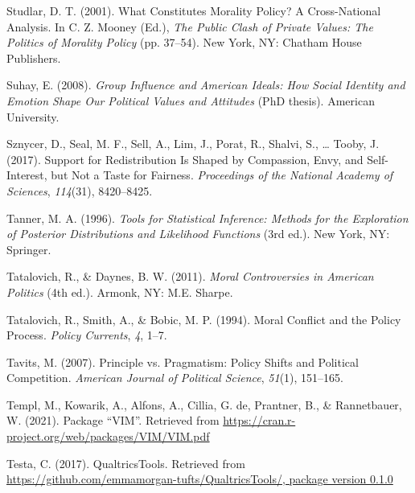 \documentclass[12pt,econ]{sources/authesis}
\newenvironment{CSLReferences}%
  {}%
  {\par}
\begin{document}
\begin{CSLReferences}{1}{0}
\leavevmode{}%
Studlar, D. T. (2001). {What Constitutes Morality Policy? A Cross-National Analysis}. In C. Z. Mooney (Ed.), \emph{The {Public} {Clash} of {Private} {Values}: {The} {Politics} of {Morality} {Policy}} (pp. 37--54). New York, NY: Chatham House Publishers.

\leavevmode{}%
Suhay, E. (2008). \emph{{Group Influence and American Ideals: How Social Identity and Emotion Shape Our Political Values and Attitudes}} (PhD thesis). American University.

\leavevmode{}%
Sznycer, D., Seal, M. F., Sell, A., Lim, J., Porat, R., Shalvi, S., \ldots{} Tooby, J. (2017). {Support for Redistribution Is Shaped by Compassion, Envy, and Self-Interest, but Not a Taste for Fairness}. \emph{Proceedings of the National Academy of Sciences}, \emph{114}(31), 8420--8425.

\leavevmode{}%
Tanner, M. A. (1996). \emph{{Tools for Statistical Inference: Methods for the Exploration of Posterior Distributions and Likelihood Functions}} (3rd ed.). New York, NY: Springer.

\leavevmode{}%
Tatalovich, R., \& Daynes, B. W. (2011). \emph{Moral {Controversies} in {American} {Politics}} (4th ed.). Armonk, NY: M.E. Sharpe.

\leavevmode{}%
Tatalovich, R., Smith, A., \& Bobic, M. P. (1994). Moral {Conflict} and the {Policy} {Process}. \emph{Policy Currents}, \emph{4}, 1--7.

\leavevmode{}%
Tavits, M. (2007). {Principle vs. Pragmatism: Policy Shifts and Political Competition}. \emph{American Journal of Political Science}, \emph{51}(1), 151--165.

\leavevmode{}%
Templ, M., Kowarik, A., Alfons, A., Cillia, G. de, Prantner, B., \& Rannetbauer, W. (2021). {Package {``VIM''}}. Retrieved from \url{https://cran.r-project.org/web/packages/VIM/VIM.pdf}

\leavevmode{}%
Testa, C. (2017). QualtricsTools. Retrieved from \href{https://github.com/emmamorgan-tufts/QualtricsTools/,\%20package\%20version\%200.1.0}{https://github.com/emmamorgan-tufts/QualtricsTools/, package version 0.1.0}


\end{CSLReferences}
\end{document}
